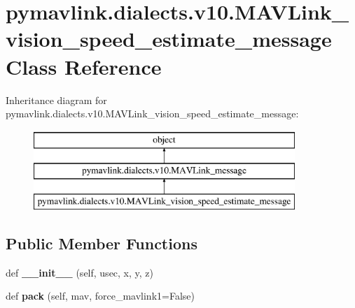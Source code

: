\hypertarget{classpymavlink_1_1dialects_1_1v10_1_1MAVLink__vision__speed__estimate__message}{}\section{pymavlink.\+dialects.\+v10.\+M\+A\+V\+Link\+\_\+vision\+\_\+speed\+\_\+estimate\+\_\+message Class Reference}
\label{classpymavlink_1_1dialects_1_1v10_1_1MAVLink__vision__speed__estimate__message}
Inheritance diagram for pymavlink.\+dialects.\+v10.\+M\+A\+V\+Link\+\_\+vision\+\_\+speed\+\_\+estimate\+\_\+message\+:\begin{figure}[H]
\begin{center}
\leavevmode
\includegraphics[height=3.000000cm]{classpymavlink_1_1dialects_1_1v10_1_1MAVLink__vision__speed__estimate__message}
\end{center}
\end{figure}
\subsection*{Public Member Functions}
\begin{DoxyCompactItemize}
\item 
\mbox{\label{classpymavlink_1_1dialects_1_1v10_1_1MAVLink__vision__speed__estimate__message_adeb1e9080e2f8f64cba3d8a46458d861}} 
def {\bfseries \+\_\+\+\_\+init\+\_\+\+\_\+} (self, usec, x, y, z)
\item 
\mbox{\label{classpymavlink_1_1dialects_1_1v10_1_1MAVLink__vision__speed__estimate__message_ac0101bf08106ca37fd15d01f5a993efb}} 
def {\bfseries pack} (self, mav, force\+\_\+mavlink1=False)
\end{DoxyCompactItemize}
